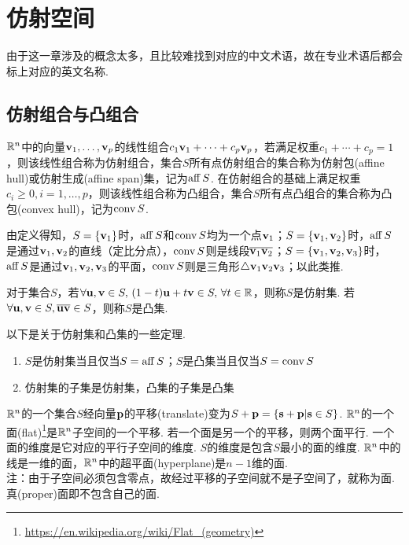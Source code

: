 
\section{仿射空间}
由于这一章涉及的概念太多，且比较难找到对应的中文术语，故在专业术语后都会标上对应的英文名称.
\subsection{仿射组合与凸组合}
\begin{definition}[仿射组合与凸组合]\rm
$\mathbb{R}^n$中的向量$\mathbf{v}_1,\dots,\mathbf{v}_p$的线性组合$c_1\mathbf{v}_1+\cdots+c_p\mathbf{v}_p$，若满足权重$c_1+\cdots+c_p=1$，则该线性组合称为仿射组合，集合$S$所有点仿射组合的集合称为仿射包(affine hull)或仿射生成(affine span)集，记为$\mathrm{aff}\, S$. 在仿射组合的基础上满足权重$c_i\geq 0,i=1,\dots,p$，则该线性组合称为凸组合，集合$S$所有点凸组合的集合称为凸包(convex hull)，记为$\mathrm{conv}\, S$.
\end{definition}
由定义得知，$S=\{\mathbf{v}_1\}$时，$\mathrm{aff}\, S$和$\mathrm{conv}\, S$均为一个点$\mathbf{v}_1$；$S=\{\mathbf{v}_1,\mathbf{v}_2\}$时，$\mathrm{aff}\, S$是通过$\mathbf{v}_1,\mathbf{v}_2$的直线（定比分点），$\mathrm{conv}\, S$则是线段$\overline{\mathbf{v}_1\mathbf{v}_2}$；$S=\{\mathbf{v}_1,\mathbf{v}_2,\mathbf{v}_3\}$时，$\mathrm{aff}\, S$是通过$\mathbf{v}_1,\mathbf{v}_2,\mathbf{v}_3$的平面，$\mathrm{conv}\, S$则是三角形$\triangle\mathbf{v}_1\mathbf{v}_2\mathbf{v}_3$；以此类推.
\begin{definition}
对于集合$S$，若$\forall\mathbf{u},\mathbf{v}\in S,\,(1-t)\mathbf{u}+t\mathbf{v}\in S,\,\forall t\in\mathbb{R}$，则称$S$是仿射集. 若$\forall\mathbf{u},\mathbf{v}\in S,\overline{\mathbf{u}\mathbf{v}}\in S$，则称$S$是凸集.
\end{definition}
\begin{theorem}以下是关于仿射集和凸集的一些定理.
\begin{enumerate}
	\itemsep -3pt
	\item $S$是仿射集当且仅当$S=\mathrm{aff}\, S$；$S$是凸集当且仅当$S=\mathrm{conv}\, S$
	\item 仿射集的子集是仿射集，凸集的子集是凸集
\end{enumerate}
\end{theorem}
\begin{definition}
\rm$\mathbb{R}^n$的一个集合$S$经向量$\mathbf{p}$的平移(translate)变为$S+\mathbf{p}=\{\mathbf{s}+\mathbf{p}|\mathbf{s}\in S\}$. $\mathbb{R}^n$的一个面(flat)\footnote{\url{https://en.wikipedia.org/wiki/Flat_(geometry)}}是$\mathbb{R}^n$子空间的一个平移. 若一个面是另一个的平移，则两个面平行. 一个面的维度是它对应的平行子空间的维度. $S$的维度是包含$S$最小的面的维度. $\mathbb{R}^n$中的线是一维的面，$\mathbb{R}^n$中的超平面(hyperplane)是$n-1$维的面.\\
注：由于子空间必须包含零点，故经过平移的子空间就不是子空间了，就称为面. 真(proper)面即不包含自己的面.
\end{definition}
